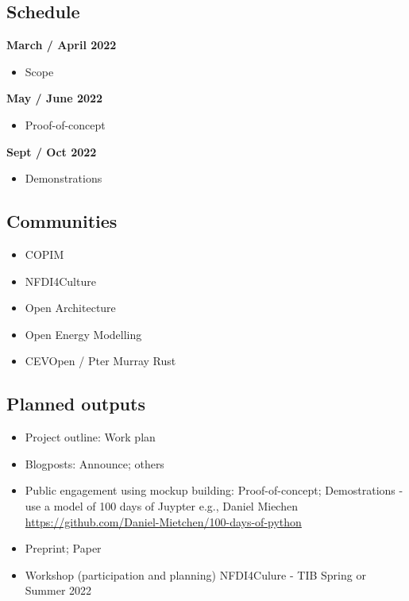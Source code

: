 \documentclass{article}
\begin{document}
\subsection{Schedule}\label{H8614052}



\textbf{March / April 2022}

\begin{itemize}
\item Scope


\end{itemize}

\textbf{May / June 2022}

\begin{itemize}
\item Proof-of-concept


\end{itemize}

\textbf{Sept / Oct 2022}

\begin{itemize}
\item Demonstrations


\end{itemize}

\subsection{Communities}\label{H637961}


\begin{itemize}
\item COPIM


\item NFDI4Culture


\item Open Architecture


\item Open Energy Modelling


\item CEVOpen / Pter Murray Rust


\end{itemize}

\subsection{Planned outputs}\label{H6024753}


\begin{itemize}
\item Project outline: Work plan


\item Blogposts: Announce; others


\item Public engagement using mockup building: Proof-of-concept; Demostrations - use a model of 100 days of Juypter e.g., Daniel Miechen \href{https://github.com/Daniel-Mietchen/100-days-of-python}{https://github.com/Daniel-Mietchen/100-days-of-python} 


\item Preprint; Paper


\item Workshop (participation and planning) NFDI4Culure - TIB Spring or Summer 2022


\end{itemize}
\end{document}
